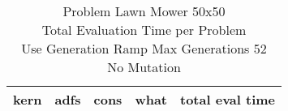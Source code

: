 \begin{table}[H]
\caption{Problem  Lawn Mower 50x50\\Total Evaluation Time per Problem \\ Use Generation Ramp  Max Generations 52\\ No Mutation \\}
\begin{center}
\scalebox{1.0} %
{
\begin{tabular}{llllr}
\hline
kern & adfs & cons & what & total eval time \\
\hline


\end{tabular}
}
\end{center}
\end{table}

